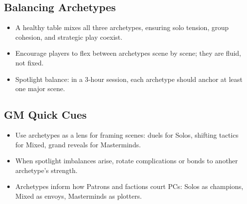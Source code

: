 \subsection{Balancing Archetypes}
\begin{itemize}
  \item A healthy table mixes all three archetypes, ensuring solo tension, group cohesion, and strategic play coexist.
  \item Encourage players to flex between archetypes scene by scene; they are fluid, not fixed.
  \item Spotlight balance: in a 3‑hour session, each archetype should anchor at least one major scene.
\end{itemize}

\subsection{GM Quick Cues}
\begin{itemize}
  \item Use archetypes as a lens for framing scenes: duels for Solos, shifting tactics for Mixed, grand reveals for Masterminds.
  \item When spotlight imbalances arise, rotate complications or bonds to another archetype's strength.
  \item Archetypes inform how Patrons and factions court PCs: Solos as champions, Mixed as envoys, Masterminds as plotters.
\end{itemize}